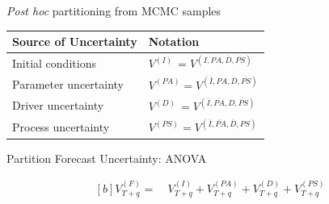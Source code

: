 \documentclass[12pt, compress, aspectratio=1610]{beamer}
\begin{document}
\begin{frame}{%
\protect\hypertarget{partitioning-from-mcmc-samples-5}{%
\emph{Post hoc} partitioning from MCMC samples}}

\begin{longtable}[]{@{}ll@{}}
\toprule
\begin{minipage}[b]{0.29\columnwidth}\raggedright
Source of Uncertainty\strut
\end{minipage} & \begin{minipage}[b]{0.25\columnwidth}\raggedright
Notation\strut
\end{minipage}\tabularnewline
\midrule
\endhead
\begin{minipage}[t]{0.29\columnwidth}\raggedright
Initial conditions\strut
\end{minipage} & \begin{minipage}[t]{0.25\columnwidth}\raggedright
\(V^{(I) \ } = V^{(I,\overline{PA},\overline{D},\overline{PS})}\)\strut
\end{minipage}\tabularnewline
\begin{minipage}[t]{0.29\columnwidth}\raggedright
Parameter uncertainty\strut
\end{minipage} & \begin{minipage}[t]{0.25\columnwidth}\raggedright
\(V^{(PA)} = V^{(\overline{I},PA,\overline{D},\overline{PS})}\)\strut
\end{minipage}\tabularnewline
\begin{minipage}[t]{0.29\columnwidth}\raggedright
Driver uncertainty\strut
\end{minipage} & \begin{minipage}[t]{0.25\columnwidth}\raggedright
\(V^{(D) \ } = V^{(\overline{I},\overline{PA},D,\overline{PS})}\)\strut
\end{minipage}\tabularnewline
\begin{minipage}[t]{0.29\columnwidth}\raggedright
Process uncertainty\strut
\end{minipage} & \begin{minipage}[t]{0.25\columnwidth}\raggedright
\(V^{(PS)}=V^{(\overline{I},\overline{PA},\overline{D},PS)}\)\strut
\end{minipage}\tabularnewline
\bottomrule
\end{longtable}

\end{frame}

\begin{frame}{%
\protect\hypertarget{partition-forecast-uncertainty-anova}{%
Partition Forecast Uncertainty: ANOVA}}

\begin{equation*}
\begin{aligned}[b]
V_{T+q}^{(F)} = \ &V_{T+q}^{(I)} + V_{T+q}^{(PA)} + V_{T+q}^{(D)} + V_{T+q}^{(PS)}
\end{aligned}
\end{equation*}

\end{frame}
\end{document}
